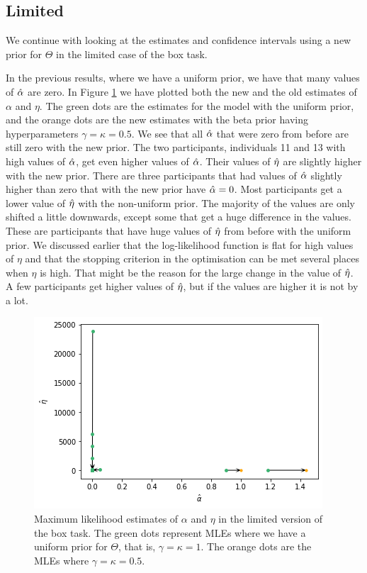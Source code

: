\subsection{Limited}
We continue with looking at the estimates and confidence intervals using a new prior for $\Theta$ in the limited case of the box task. 

In the previous results, where we have a uniform prior, we have that many values of $\hat{\alpha}$ are zero. In Figure \ref{fig:sensitivity_mles_lim_a_e} we have plotted both the new and the old estimates of $\alpha$ and $\eta$. The green dots are the estimates for the model with the uniform prior, and the orange dots are the new estimates with the beta prior having hyperparameters $\gamma=\kappa=0.5$. 
We see that all $\hat{\alpha}$ that were zero from before are still zero with the new prior. The two participants, individuals 11 and 13 with high values of $\hat{\alpha}$, get even higher values of $\hat{\alpha}$. Their values of $\hat{\eta}$ are slightly higher with the new prior. 
There are three participants that had values of $\hat{\alpha}$ slightly higher than zero that with the new prior have $\hat{\alpha}=0$. 
Most participants get a lower value of $\hat{\eta}$ with the non-uniform prior. The majority of the values are only shifted a little downwards, except some that get a huge difference in the values. These are participants that have huge values of $\hat{\eta}$ from before with the uniform prior. We discussed earlier that the log-likelihood function is flat for high values of $\eta$ and that the stopping criterion in the optimisation can be met several places when $\eta$ is high. That might be the reason for the large change in the value of $\hat{\eta}$. 
A few participants get higher values of $\hat{\eta}$, but if the values are higher it is not by a lot. 
\begin{figure}
    \centering
    \includegraphics[scale=0.8]{pictures/Sensitivity/mles_lim_a_e.png}
    \caption[MLEs of $\alpha$ and $\eta$ for prior with $\gamma=\kappa=1$ and $\gamma=\kappa=0.5$, limited]{
    Maximum likelihood estimates of $\alpha$ and $\eta$ in the limited version of the box task. The green dots represent MLEs where we have a uniform prior for $\Theta$, that is, $\gamma=\kappa=1$. The orange dots are the MLEs where $\gamma=\kappa=0.5$.}
    \label{fig:sensitivity_mles_lim_a_e}
\end{figure}

